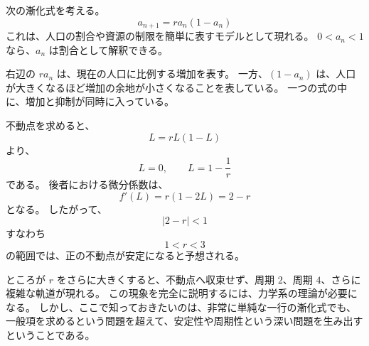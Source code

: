 次の漸化式を考える。
\[
  a_{n+1}=r a_n(1-a_n)
\]
これは、人口の割合や資源の制限を簡単に表すモデルとして現れる。
$0<a_n<1$ なら、$a_n$ は割合として解釈できる。

右辺の $ra_n$ は、現在の人口に比例する増加を表す。
一方、$(1-a_n)$ は、人口が大きくなるほど増加の余地が小さくなることを表している。
一つの式の中に、増加と抑制が同時に入っている。

不動点を求めると、
\[
  L=rL(1-L)
\]
より、
\[
  L=0,\qquad L=1-\frac1r
\]
である。
後者における微分係数は、
\[
  f'(L)=r(1-2L)=2-r
\]
となる。
したがって、
\[
  |2-r|<1
\]
すなわち
\[
  1<r<3
\]
の範囲では、正の不動点が安定になると予想される。

ところが $r$ をさらに大きくすると、不動点へ収束せず、周期 $2$、周期 $4$、さらに複雑な軌道が現れる。
この現象を完全に説明するには、力学系の理論が必要になる。
しかし、ここで知っておきたいのは、非常に単純な一行の漸化式でも、一般項を求めるという問題を超えて、安定性や周期性という深い問題を生み出すということである。
